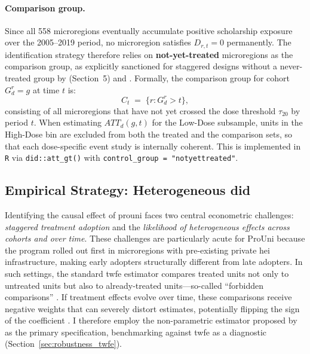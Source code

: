 \paragraph{Comparison group.}
Since all 558 microregions eventually accumulate positive scholarship exposure over the 2005--2019 period, no microregion satisfies $D_{r,t} = 0$ permanently. The identification strategy therefore relies on \textbf{not-yet-treated} microregions as the comparison group, as explicitly sanctioned for staggered designs without a never-treated group by  (Section~5) and . Formally, the comparison group for cohort $G_d^r = g$ at time $t$ is:
\begin{equation}
    C_t \;=\; \bigl\{r : G_d^r > t \bigr\},
    \label{eq:comparison_group}
\end{equation}
consisting of all microregions that have not yet crossed the dose threshold $\tau_{20}$ by period $t$. When estimating $ATT_d(g,t)$ for the Low-Dose subsample, units in the High-Dose bin are excluded from both the treated and the comparison sets, so that each dose-specific event study is internally coherent. This is implemented in \texttt{R} via \texttt{did::att\_gt()} with \texttt{control\_group = "notyettreated"}.


\subsection{Empirical Strategy: Heterogeneous \acrshort{did}}
\label{sec:empirical_strategy}

Identifying the causal effect of \acrshort{prouni} faces two central econometric challenges: \emph{staggered treatment adoption} and the \emph{likelihood of heterogeneous effects across cohorts and over time}. These challenges are particularly acute for ProUni because the program rolled out first in microregions with pre-existing private \acrshort{hei} infrastructure, making early adopters structurally different from late adopters. In such settings, the standard \acrfull{twfe} estimator compares treated units not only to untreated units but also to already-treated units---so-called ``forbidden comparisons'' \cite{GoodmanBacon2021}. If treatment effects evolve over time, these comparisons receive negative weights that can severely distort estimates, potentially flipping the sign of the coefficient \cite{deChaisemartin2020, GoodmanBacon2021}. I therefore employ the non-parametric estimator proposed by  as the primary specification, benchmarking against \acrshort{twfe} as a diagnostic (Section~\ref{sec:robustness_twfe}).


